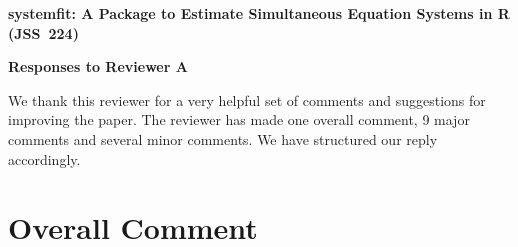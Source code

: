 \documentclass[12pt,english]{scrartcl}
\begin{document}
\begin{center}
{\Large\textbf{
systemfit: A Package to Estimate
Simultaneous Equation Systems in R (JSS~224)}}

\bigskip

{\Large\textbf{Responses to Reviewer A}}
\end{center}


We thank this reviewer for a very helpful set of comments and suggestions
for improving the paper.
The reviewer has made one overall comment, 9 major comments and
several minor comments.
We have structured our reply accordingly.

\section{Overall Comment}
% 
% 
% 
\end{document}
